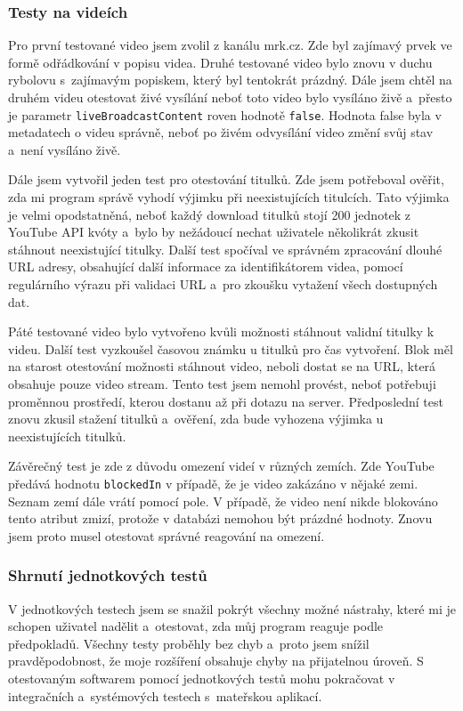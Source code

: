 \subsubsection{Testy na videích}
\par Pro první testované video jsem zvolil  z kanálu mrk.cz. Zde byl zajímavý prvek ve formě odřádkování v popisu videa. Druhé testované video bylo znovu v duchu rybolovu s~zajímavým popiskem, který byl tentokrát prázdný. Dále jsem chtěl na druhém videu otestovat živé vysílání neboť toto video bylo vysíláno živě a~přesto je parametr \texttt{liveBroadcastContent} roven hodnotě \texttt{false}. Hodnota false byla v metadatech o videu správně, neboť po živém odvysílání video změní svůj stav a~není vysíláno živě.
\par Dále jsem vytvořil jeden test pro otestování titulků. Zde jsem potřeboval ověřit, zda mi program správě vyhodí výjimku při neexistujících titulcích. Tato výjimka je velmi opodstatněná, neboť každý download titulků stojí 200 jednotek z YouTube API kvóty a~bylo by nežádoucí nechat uživatele několikrát zkusit stáhnout neexistující titulky. Další test spočíval ve správném zpracování dlouhé URL adresy, obsahující další informace za identifikátorem videa, pomocí regulárního výrazu při validaci URL a~pro zkoušku vytažení všech dostupných dat.
\par Páté testované video bylo vytvořeno kvůli možnosti stáhnout validní titulky k videu. Další test vyzkoušel časovou známku u titulků pro čas vytvoření. Blok  měl na starost otestování možnosti stáhnout video, neboli dostat se na URL, která obsahuje pouze video stream. Tento test jsem nemohl provést, neboť potřebuji proměnnou prostředí, kterou dostanu až při dotazu na server. Předposlední test znovu zkusil stažení titulků a~ověření, zda bude vyhozena výjimka u neexistujících titulků.
\par Závěrečný test je zde z důvodu omezení videí v různých zemích. Zde YouTube předává hodnotu \texttt{blockedIn} v případě, že je video zakázáno v nějaké zemi. Seznam zemí dále vrátí pomocí pole. V případě, že video není nikde blokováno tento atribut zmizí, protože v databázi nemohou být prázdné hodnoty. Znovu jsem proto musel otestovat správné reagování na omezení.
\subsubsection{Shrnutí jednotkových testů}
\par V jednotkových testech jsem se snažil pokrýt všechny možné nástrahy, které mi je schopen uživatel nadělit a~otestovat, zda můj program reaguje podle předpokladů. Všechny testy proběhly bez chyb a~proto jsem snížil pravděpodobnost, že moje rozšíření obsahuje chyby na přijatelnou úroveň. S otestovaným softwarem pomocí jednotkových testů mohu pokračovat v integračních a~systémových testech s~mateřskou aplikací.
